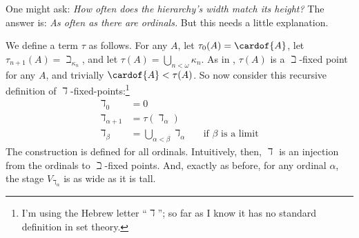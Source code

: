 \documentclass[../../../include/open-logic-section]{subfiles}
\begin{document}
One might ask: \emph{How often does the hierarchy's width match its height?} The answer is: \emph{As often as there are ordinals.} But this needs a little explanation. 

We define a term $\tau$ as follows. For any $A$, let $\tau_0(A) = \cardof{A}$, let $\tau_{n+1}(A) = \beth_{\kappa_n}$, and let $\tau(A) = \bigcup_{n < \omega}\kappa_n$. As in , $\tau(A)$ is a $\beth$-fixed point for any $A$, and trivially $\cardof{A} < \tau(A)$. So now consider this recursive definition of $\daleth$-fixed-points:\footnote{I'm using the Hebrew letter ``$\daleth$''; so far as I know it has no standard definition in set theory.}
\begin{align*}
	\daleth_0 &= 0\\
	\daleth_{\alpha + 1} &= \tau(\daleth_\alpha)\\
	\daleth_\beta &= \bigcup_{\alpha < \beta} \daleth_\alpha&&\text{if }\beta\text{ is a limit}
\end{align*}
 The construction is defined for all ordinals. Intuitively, then, $\daleth$ is an injection from the ordinals to $\beth$-fixed points. And, exactly as before, for any ordinal $\alpha$, the stage $V_{\daleth_\alpha}$ is as wide as it is tall.
\end{document}
